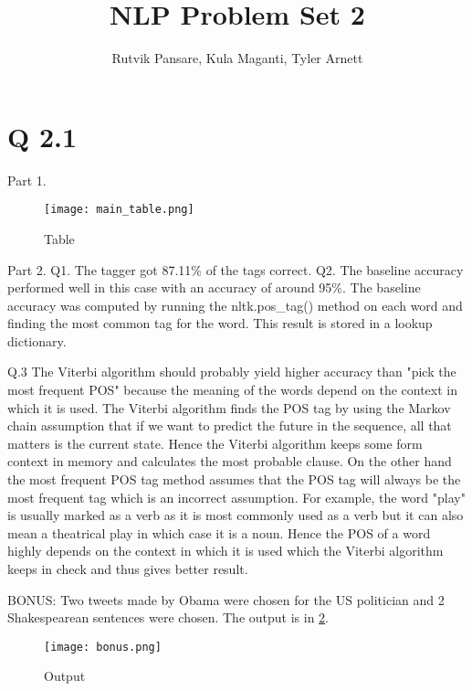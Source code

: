 \documentclass{article}
\title{NLP Problem Set 2}
\date{}
\author{Rutvik Pansare, Kula Maganti, Tyler Arnett}
\begin{document}
\maketitle

\section*{Q 2.1}


\begin{flushleft}

Part 1.

\begin{figure}[htp]
    \centering
    \texttt{[image: main\_table.png]}
    \caption{Table}
    \label{Table}
\end{figure}


Part 2.
\vskip 0.2in
Q1. 
The tagger got 87.11\% of the tags correct.
\vskip 0.2in
Q2. 
The baseline accuracy performed well in this case with an accuracy of around 95\%. The baseline accuracy was computed by running the nltk.pos\_tag() method on each word and finding the most common tag for the word. This result is stored in a lookup dictionary.
\vskip 0.2in

Q.3
The Viterbi algorithm should probably yield higher accuracy than "pick the most frequent POS" because the meaning of the words depend on the context in which it is used. The Viterbi algorithm finds the POS tag by using the Markov chain assumption that if we want to predict the future in the sequence, all that matters is the current state. Hence the Viterbi algorithm keeps some form context in memory and calculates the most probable clause. On the other hand the most frequent POS tag method assumes that the POS tag will always be the most frequent tag which is an incorrect assumption. For example, the word "play" is usually marked as a verb as it is most commonly used as a verb but it can also mean a theatrical play in which case it is a noun. Hence the POS of a word highly depends on the context in which it is used which the Viterbi algorithm keeps in check and thus gives better result.
\vskip 0.2in

BONUS:
Two tweets made by Obama were chosen for the US politician and 2 Shakespearean sentences were chosen.
The output is in \ref{output}.
\begin{figure}[htp]
    \centering
    \texttt{[image: bonus.png]}
    \caption{Output}
    \label{output}
\end{figure}
\vskip 0.2in


\end{flushleft}
\end{document}
